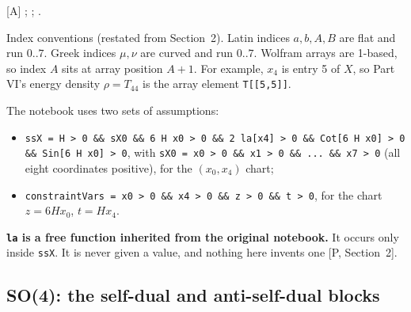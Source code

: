 [A] ; ;
.

Index conventions (restated from Section~2). Latin indices $a,b,A,B$ are flat and run $0..7$.
Greek indices $\mu,\nu$ are curved and run $0..7$. Wolfram arrays are 1-based, so index $A$ sits
at array position $A+1$. For example, $x_4$ is entry 5 of $X$, so Part VI's energy density
$\rho=T_{44}$ is the array element \texttt{T[[5,5]]}.

The notebook uses two sets of assumptions:
\begin{itemize}
  \item \texttt{ssX = H > 0 \&\& sX0 \&\& 6 H x0 > 0 \&\& 2 la[x4] > 0 \&\& Cot[6 H x0] > 0
        \&\& Sin[6 H x0] > 0}, with \texttt{sX0 = x0 > 0 \&\& x1 > 0 \&\& ... \&\& x7 > 0} (all
        eight coordinates positive), for the $(x_0,x_4)$ chart;
  \item \texttt{constraintVars = x0 > 0 \&\& x4 > 0 \&\& z > 0 \&\& t > 0}, for the chart
        $z = 6Hx_0$, $t = Hx_4$.
\end{itemize}
\textbf{\texttt{la} is a free function inherited from the original notebook.} It occurs only
inside \texttt{ssX}. It is never given a value, and nothing here invents one [P, Section~2].

\subsection{SO(4): the self-dual and anti-self-dual blocks}
\label{fnd:so4}\label{sec:2.3}

